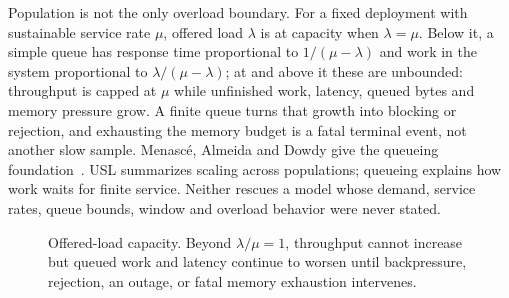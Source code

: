 Population is not the only overload boundary. For a fixed deployment with
sustainable service rate $\mu$, offered load $\lambda$ is at capacity when
$\lambda=\mu$. Below it, a simple queue has response time proportional to
$1/(\mu-\lambda)$ and work in the system proportional to
$\lambda/(\mu-\lambda)$; at and above it these are unbounded: throughput is
capped at $\mu$ while unfinished work, latency, queued bytes and memory pressure
grow. A finite queue turns that growth into blocking or rejection, and exhausting
the memory budget is a fatal terminal event, not another slow sample. Menasc\'e,
Almeida and Dowdy give the queueing foundation~\citep{menasce2004performance}.
USL summarizes scaling across populations; queueing explains how work waits for
finite service. Neither rescues a model whose demand, service rates, queue
bounds, window and overload behavior were never stated.

\begin{figure}[htbp]
\centering
\begin{minipage}{.48\textwidth}
\centering
{}
\end{minipage}\hfill
\begin{minipage}{.48\textwidth}
\centering
{}
\end{minipage}
\caption{Offered-load capacity. Beyond $\lambda/\mu=1$, throughput cannot
increase but queued work and latency continue to worsen until backpressure,
rejection, an outage, or fatal memory exhaustion intervenes.}
\label{fig:offered-load-capacity}
\end{figure}

